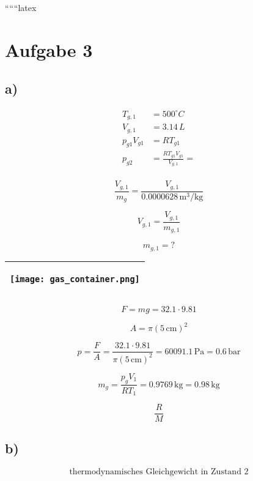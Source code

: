 
``````latex


\section*{Aufgabe 3}

\subsection*{a)}

\begin{align*}
T_{g,1} &= 500^\circ C \\
V_{g,1} &= 3.14 \, L \\
p_{g1} V_{g1} &= R T_{g1} \\
p_{g2} &= \frac{R T_{g1} V_{g1}}{V_{g,1}} = \\
\end{align*}

\[
\frac{V_{g,1}}{m_{g}} = \frac{V_{g,1}}{0.0000628 \, \text{m}^3/\text{kg}}
\]

\[
V_{g,1} = \frac{V_{g,1}}{m_{g,1}}
\]

\[
m_{g,1} = ?
\]

\begin{center}
\begin{tabular}{|c|}
\hline
\begin{minipage}{0.2\textwidth}
\begin{center}
\texttt{[image: gas\_container.png]}
\end{center}
\end{minipage} \\
\hline
\end{tabular}
\end{center}

\[
F = m g = 32.1 \cdot 9.81
\]

\[
A = \pi (5 \, \text{cm})^2
\]

\[
p = \frac{F}{A} = \frac{32.1 \cdot 9.81}{\pi (5 \, \text{cm})^2} = 60091.1 \, \text{Pa} = 0.6 \, \text{bar}
\]

\[
m_{g} = \frac{p_{g} V_{1}}{R T_{1}} = 0.9769 \, \text{kg} = 0.98 \, \text{kg}
\]

\[
\frac{R}{M}
\]

\subsection*{b)}

\[
\text{thermodynamisches Gleichgewicht in Zustand 2}
\]

